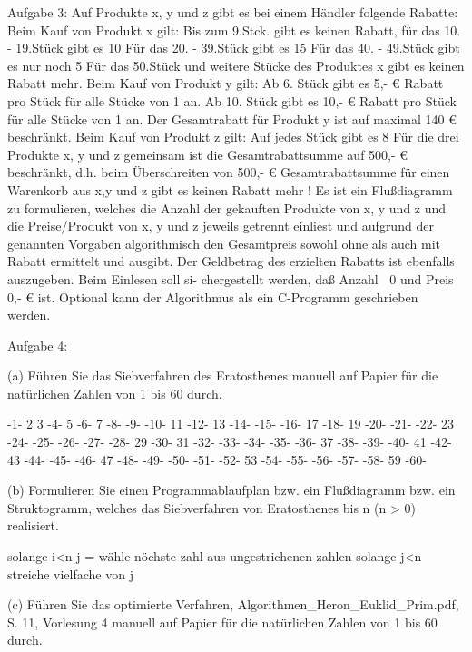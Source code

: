 Aufgabe 3: Auf Produkte x, y und z gibt es bei einem Händler folgende Rabatte:
Beim Kauf von Produkt x gilt:
Bis zum 9.Stck. gibt es keinen Rabatt, für das 10. - 19.Stück gibt es 10%
Für das 20. - 39.Stück gibt es 15%
Für das 40. - 49.Stück gibt es nur noch 5 %
Für das 50.Stück und weitere Stücke des Produktes x gibt es keinen Rabatt mehr.
Beim Kauf von Produkt y gilt:
Ab 6. Stück gibt es 5,- € Rabatt pro Stück für alle Stücke von 1 an.
Ab 10. Stück gibt es 10,- € Rabatt pro Stück für alle Stücke von 1 an.
Der Gesamtrabatt für Produkt y ist auf maximal 140 € beschränkt.
Beim Kauf von Produkt z gilt:
Auf jedes Stück gibt es 8%
Für die drei Produkte x, y und z gemeinsam ist die Gesamtrabattsumme auf 500,- €
beschränkt, d.h. beim Überschreiten von 500,- € Gesamtrabattsumme für einen Warenkorb
aus x,y und z gibt es keinen Rabatt mehr !
Es ist ein Flußdiagramm zu formulieren, welches die Anzahl der gekauften Produkte von
x, y und z und die Preise/Produkt von x, y und z jeweils getrennt einliest und aufgrund der
genannten Vorgaben algorithmisch den Gesamtpreis sowohl ohne als auch mit Rabatt ermittelt
und ausgibt. Der Geldbetrag des erzielten Rabatts ist ebenfalls auszugeben. Beim Einlesen soll si-
chergestellt werden, daß Anzahl 0 und Preis  0,- € ist.
Optional kann der Algorithmus als ein C-Programm geschrieben werden.

Aufgabe 4:

(a) Führen Sie das Siebverfahren des Eratosthenes manuell auf Papier für die natürlichen Zahlen von 1 bis 60 durch.

 -1-   2   3   -4-   5   -6-   7   -8-   -9-  -10-
11  -12-  13  -14-  -15-  -16-  17  -18-  19  -20-
-21-  -22-  23  -24-  -25-  -26-  -27-  -28-  29  -30-
31  -32-  -33-  -34-  -35-  -36-  37  -38-  -39-  -40-
41  -42-  43  -44-  -45-  -46-  47  -48-  -49-  -50-
-51-  -52-  53  -54-  -55-  -56-  -57-  -58-  59  -60-

(b) Formulieren Sie einen Programmablaufplan bzw. ein Flußdiagramm bzw. ein Struktogramm, welches das Siebverfahren von Eratosthenes bis n (n > 0) realisiert.

    solange i<n
      j = wähle nöchste zahl aus ungestrichenen zahlen
      solange j<n
        streiche vielfache von j

(c) Führen Sie das optimierte Verfahren, Algorithmen_Heron_Euklid_Prim.pdf, S. 11, Vorlesung 4 manuell auf Papier für die natürlichen Zahlen von 1 bis 60 durch.

